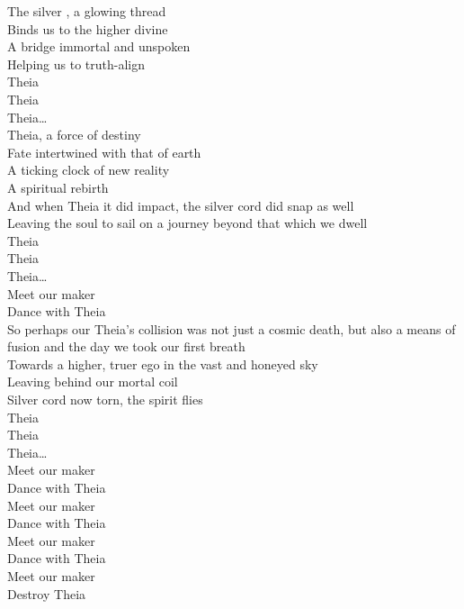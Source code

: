 


The silver , a glowing thread\\
Binds us to the higher divine\\
A bridge immortal and unspoken\\
Helping us to truth-align\\

Theia\\
Theia\\
Theia…\\

Theia, a force of destiny\\
Fate intertwined with that of earth\\
A ticking clock of new reality\\
A spiritual rebirth\\
And when Theia it did impact, the silver cord did snap as well\\
Leaving the soul to sail on a journey beyond that which we dwell\\

Theia\\
Theia\\
Theia…\\

Meet our maker\\
Dance with Theia\\

So perhaps our Theia's collision was not just a cosmic death, but also a means of fusion and the day we took our first breath\\
Towards a higher, truer ego in the vast and honeyed sky\\
Leaving behind our mortal coil\\
Silver cord now torn, the spirit flies\\

Theia\\
Theia\\
Theia…\\

Meet our maker\\
Dance with Theia\\
Meet our maker\\
Dance with Theia\\
Meet our maker\\
Dance with Theia\\
Meet our maker\\
Destroy Theia\\

